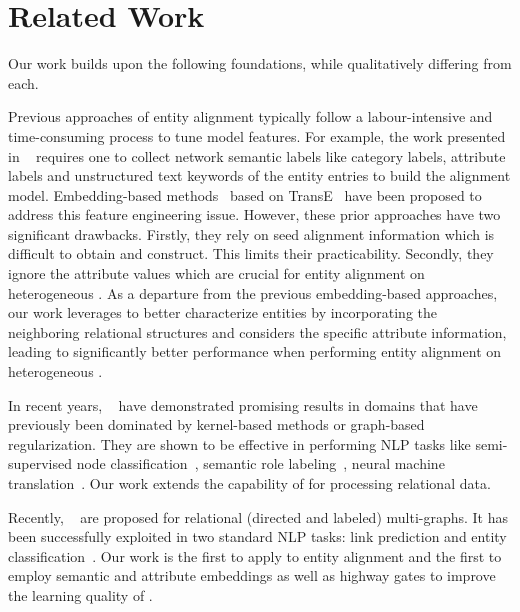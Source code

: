 
	
	\section{Related Work}
    Our work builds upon the following foundations, while qualitatively differing from each.

    	 Previous approaches of entity alignment typically
follow a labour-intensive and time-consuming process to tune model features. For example, the work presented in ~\cite{Wang2017} requires
one to collect network semantic labels like category labels, attribute labels and unstructured text keywords of the entity entries to build
the alignment model. Embedding-based methods~\cite{hao2016joint,chen2016multilingual,sun2017cross,zhu2017iterative} based on
TransE~\cite{bordes2013translating} have been proposed to address this feature engineering issue. However, these prior approaches have two
significant drawbacks. Firstly, they rely on seed alignment information which is difficult to obtain and construct. This limits their
practicability. Secondly, they ignore the attribute values which are crucial for entity alignment on heterogeneous \KGs. As a departure
from the previous embedding-based approaches, our work leverages \RGCNs to better characterize entities by incorporating the neighboring
relational structures and considers the specific attribute information, leading to significantly better performance when performing entity
alignment on heterogeneous \KGs.

	 In recent years, \GCNs~\cite{Duvenaud2015Convolutional,Kearnes2016Molecular}
    have demonstrated promising results in domains that have previously been dominated by kernel-based methods or graph-based regularization.
    They are shown to be effective in performing NLP tasks like semi-supervised
    node classification~\cite{Kipf2016Semi}, semantic role labeling~\cite{Marcheggiani2017Encoding}, neural machine
    translation~\cite{Bastings2017Graph}. Our work extends the capability of \GCNs for processing relational data.


	Recently, \RGCNs~\cite{Schlichtkrull2017Modeling} are proposed  for relational (directed and labeled) multi-graphs. It has been
successfully exploited in two standard NLP tasks: link prediction and entity classification~\cite{Schlichtkrull2017Modeling}. Our work is
the first to apply \RGCNs to entity alignment and the first to employ semantic and attribute embeddings as well as highway gates to improve
the learning quality of \RGCNs.

